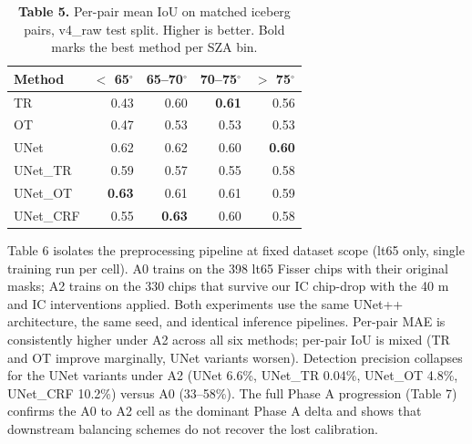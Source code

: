\documentclass[review,jog]{igs}
\begin{document}
\begin{table}[h]
\caption{\textbf{Table 5.} Per-pair mean IoU on matched iceberg pairs, v4\_raw test split. Higher is better. Bold marks the best method per SZA bin.}
\centering
\begin{tabular}{lrrrr}
\toprule
Method & $<$ 65$^\circ$ & 65--70$^\circ$ & 70--75$^\circ$ & $>$ 75$^\circ$ \\
\midrule
TR        & 0.43           & 0.60           & \textbf{0.61}  & 0.56 \\
OT        & 0.47           & 0.53           & 0.53           & 0.53 \\
UNet      & 0.62           & 0.62           & 0.60           & \textbf{0.60} \\
UNet\_TR  & 0.59           & 0.57           & 0.55           & 0.58 \\
UNet\_OT  & \textbf{0.63}  & 0.61           & 0.61           & 0.59 \\
UNet\_CRF & 0.55           & \textbf{0.63}  & 0.60           & 0.58 \\
\bottomrule
\end{tabular}
\end{table}

Table 6 isolates the preprocessing pipeline at fixed dataset scope (lt65 only, single training run per cell). A0 trains on the 398 lt65 Fisser chips with their original masks; A2 trains on the 330 chips that survive our IC chip-drop with the 40 m and IC interventions applied. Both experiments use the same UNet++ architecture, the same seed, and identical inference pipelines. Per-pair MAE is consistently higher under A2 across all six methods; per-pair IoU is mixed (TR and OT improve marginally, UNet variants worsen). Detection precision collapses for the UNet variants under A2 (UNet 6.6\%, UNet\_TR 0.04\%, UNet\_OT 4.8\%, UNet\_CRF 10.2\%) versus A0 (33--58\%). The full Phase A progression (Table 7) confirms the A0 to A2 cell as the dominant Phase A delta and shows that downstream balancing schemes do not recover the lost calibration.
\end{document}
